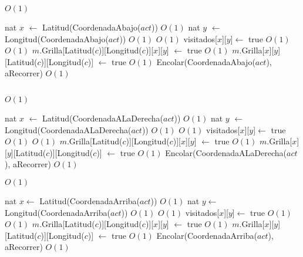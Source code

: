 \begin{Algoritmos}
\begin{algorithmic}[1]
\State $ $

      \Comment $O(1)$

\State nat $x$ $\gets$ Latitud(CoordenadaAbajo($act$))   \Comment $O(1)$
\State nat $y$ $\gets$ Longitud(CoordenadaAbajo($act$))  \Comment $O(1)$
    \Comment $O(1)$
\State visitados[$x$][$y$]$ \gets$ true    \Comment $O(1)$
	 	\Comment $O(1)$
		\State $m$.Grilla[Latitud($c$)][Longitud($c$)][$x$][$y$] $ \gets $ true \Comment $O(1)$
		\State $m$.Grilla[$x$][$y$][Latitud($c$)][Longitud($c$)] $ \gets $ true \Comment $O(1)$
		\State Encolar(CoordenadaAbajo($act$), aRecorrer) \Comment $O(1)$	
	\EndIf
\EndIf
\EndIf

\State $ $


      \Comment $O(1)$

\State nat $x$ $\gets$ Latitud(CoordenadaALaDerecha($act$))   \Comment $O(1)$
\State nat $y$ $\gets$ Longitud(CoordenadaALaDerecha($act$))  \Comment $O(1)$
    \Comment $O(1)$
\State visitados[$x$][$y$]$ \gets$ true    \Comment $O(1)$
	 	\Comment $O(1)$
		\State $m$.Grilla[Latitud($c$)][Longitud($c$)][$x$][$y$] $ \gets $ true \Comment $O(1)$
		\State $m$.Grilla[$x$][$y$][Latitud($c$)][Longitud($c$)] $ \gets $ true \Comment $O(1)$
		\State Encolar(CoordenadaALaDerecha($act$), aRecorrer) \Comment $O(1)$	
	\EndIf
\EndIf
\EndIf
\State $ $

      \Comment $O(1)$

\State nat $x \gets$ Latitud(CoordenadaArriba($act$))   \Comment $O(1)$
\State nat $y \gets$ Longitud(CoordenadaArriba($act$))  \Comment $O(1)$
    \Comment $O(1)$
\State visitados[$x$][$y$]$ \gets$ true    \Comment $O(1)$
	 	\Comment $O(1)$
		\State $m$.Grilla[Latitud($c$)][Longitud($c$)][$x$][$y$] $ \gets $ true \Comment $O(1)$
		\State $m$.Grilla[$x$][$y$][Latitud($c$)][Longitud($c$)] $ \gets $ true \Comment $O(1)$
		\State Encolar(CoordenadaArriba($act$), aRecorrer) \Comment $O(1)$	
	\EndIf
\EndIf
\EndIf

\EndWhile


\end{algorithmic}
\end{Algoritmos}
